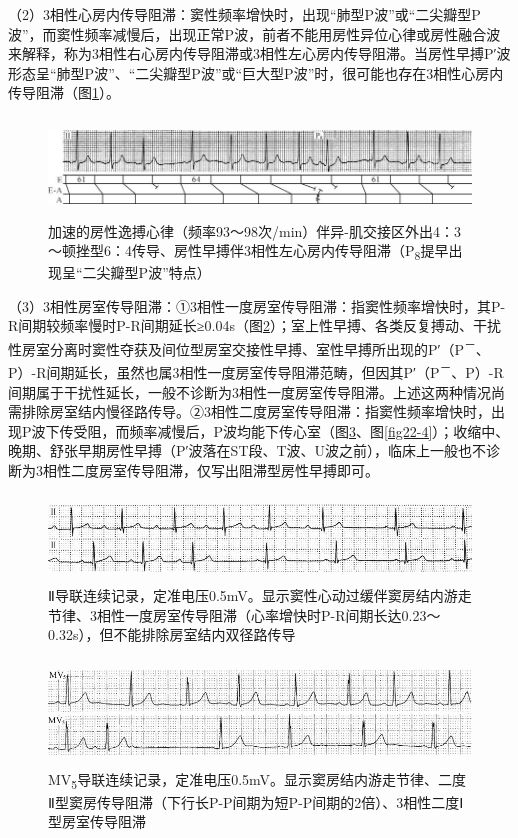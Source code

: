 （2）3相性心房内传导阻滞：窦性频率增快时，出现“肺型P波”或“二尖瓣型P波”，而窦性频率减慢后，出现正常P波，前者不能用房性异位心律或房性融合波来解释，称为3相性右心房内传导阻滞或3相性左心房内传导阻滞。当房性早搏P′波形态呈“肺型P波”、“二尖瓣型P波”或“巨大型P波”时，很可能也存在3相性心房内传导阻滞（图\ref{fig22-1}）。

\begin{figure}[!htbp]
 \centering
 \includegraphics[width=6in,height=1.04167in]{./images/Image00366.jpg}
 \captionsetup{justification=centering}
 \caption{加速的房性逸搏心律（频率93～98次/min）伴异-肌交接区外出4：3～顿挫型6：4传导、房性早搏伴3相性左心房内传导阻滞（P\textsubscript{8}提早出现呈“二尖瓣型P波”特点）}
 \label{fig22-1}
  \end{figure} 


（3）3相性房室传导阻滞：①3相性一度房室传导阻滞：指窦性频率增快时，其P-R间期较频率慢时P-R间期延长≥0.04s（图\ref{fig22-2}）；室上性早搏、各类反复搏动、干扰性房室分离时窦性夺获及间位型房室交接性早搏、室性早搏所出现的P′（P\textsuperscript{－}、P）-R间期延长，虽然也属3相性一度房室传导阻滞范畴，但因其P′（P\textsuperscript{－}、P）-R间期属于干扰性延长，一般不诊断为3相性一度房室传导阻滞。上述这两种情况尚需排除房室结内慢径路传导。②3相性二度房室传导阻滞：指窦性频率增快时，出现P波下传受阻，而频率减慢后，P波均能下传心室（图\ref{fig22-3}、图\ref{fig22-4}）；收缩中、晚期、舒张早期房性早搏（P′波落在ST段、T波、U波之前），临床上一般也不诊断为3相性二度房室传导阻滞，仅写出阻滞型房性早搏即可。

\begin{figure}[!htbp]
 \centering
 \includegraphics[width=5.58333in,height=0.90625in]{./images/Image00367.jpg}
 \captionsetup{justification=centering}
 \caption{Ⅱ导联连续记录，定准电压0.5mV。显示窦性心动过缓伴窦房结内游走节律、3相性一度房室传导阻滞（心率增快时P-R间期长达0.23～0.32s），但不能排除房室结内双径路传导}
 \label{fig22-2}
  \end{figure} 

\begin{figure}[!htbp]
 \centering
 \includegraphics[width=5.58333in,height=1.11458in]{./images/Image00368.jpg}
 \captionsetup{justification=centering}
 \caption{MV\textsubscript{5}导联连续记录，定准电压0.5mV。显示窦房结内游走节律、二度Ⅱ型窦房传导阻滞（下行长P-P间期为短P-P间期的2倍）、3相性二度Ⅰ型房室传导阻滞}
 \label{fig22-3}
  \end{figure} 


